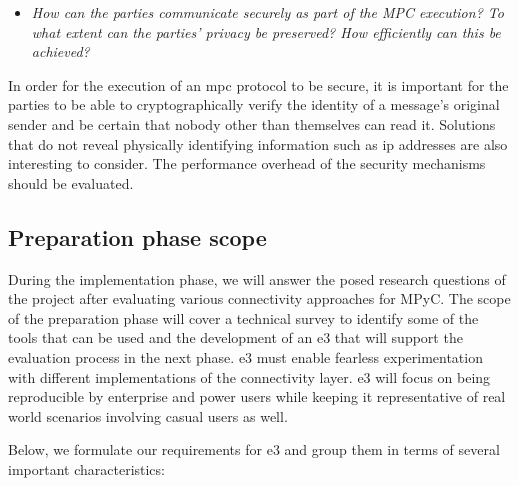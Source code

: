 \documentclass[
]{article}
\providecommand{\tightlist}{%
  \setlength{\itemsep}{0pt}\setlength{\parskip}{0pt}}
\begin{document}
\begin{itemize}
  \tightlist
  \item
        \emph{How can the parties communicate securely as part of the MPC
          execution? To what extent can the parties' privacy be preserved? How
          efficiently can this be achieved?}
\end{itemize}

In order for the execution of an \gls{mpc} protocol to be secure, it is
important for the parties to be able to cryptographically verify the
identity of a message's original sender and be certain that nobody other
than themselves can read it. Solutions that do not reveal physically
identifying information such as \gls{ip} addresses are also interesting
to consider. The performance overhead of the security mechanisms should
be evaluated.

\hypertarget{preparation-phase-scope}{%
  \subsection{Preparation phase scope}\label{preparation-phase-scope}}

During the implementation phase, we will answer the posed research
questions of the project after evaluating various connectivity
approaches for MPyC. The scope of the preparation phase will cover a
technical survey to identify some of the tools that can be used and the
development of an \gls{e3} that will support the evaluation process in
the next phase. \gls{e3} must enable fearless experimentation with
different implementations of the connectivity layer. \gls{e3} will focus
on being reproducible by enterprise and power users while keeping it
representative of real world scenarios involving casual users as well.

Below, we formulate our requirements for \gls{e3} and group them in
terms of several important characteristics:
\end{document}

